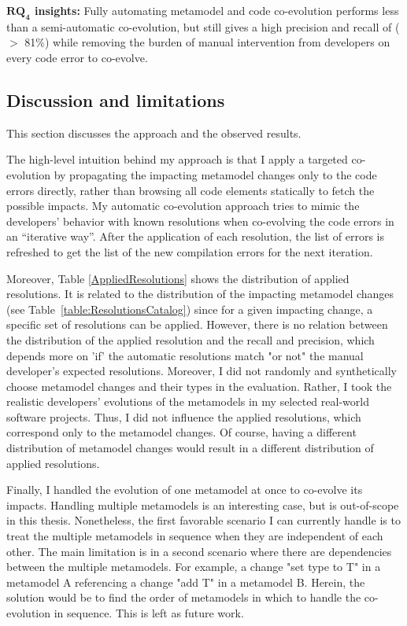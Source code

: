 \begin{tcolorbox}[boxsep=-2pt]
\textbf{$\boldsymbol{RQ_4}$ insights:}
Fully automating metamodel and code co-evolution performs less than a semi-automatic co-evolution, but still gives a high precision and recall of ($>$ 81\%) while removing the burden of manual intervention from developers on every code error to co-evolve. 
\end{tcolorbox}


\subsection{Discussion and limitations}
This section discusses the approach and the observed results. 

The high-level intuition behind my approach is that I apply a targeted co-evolution by propagating the impacting metamodel changes only to the code errors directly, rather than browsing all code elements statically to fetch the possible impacts.
My automatic co-evolution approach tries to mimic the developers' behavior with known resolutions when co-evolving the code errors in an “iterative way”. After the application of each resolution, the list of errors %
is refreshed to get the list of the new compilation errors for the next iteration.

Moreover, Table \ref{AppliedResolutions} shows the distribution of applied resolutions. It is related to the distribution of the impacting metamodel changes (see Table~\ref{table:ResolutionsCatalog}) since for a given impacting change, a specific set of resolutions can be applied. 
However, there is no relation between the distribution of the applied resolution and the recall and precision, which depends more on 'if' the automatic resolutions match "or not" the manual developer’s expected resolutions. Moreover, I did not randomly and synthetically choose metamodel changes and their types in the evaluation. Rather, I took the realistic developers' evolutions of the metamodels in my selected real-world software projects. Thus, I did not influence the applied resolutions, which correspond only to the metamodel changes. Of course, having a different distribution of metamodel changes would result in a different distribution of applied resolutions. 

Finally, I handled the evolution of one metamodel at once to co-evolve its impacts. Handling multiple metamodels is an interesting case, but is out-of-scope in this thesis. Nonetheless, the first favorable scenario I can currently handle is to treat the multiple metamodels in sequence when they are independent of each other. The main limitation is in a second scenario where there are dependencies between the multiple metamodels. For example, a change "set type to T" in a metamodel A referencing a change "add T" in a metamodel B. Herein, the solution would be to find the order of metamodels in which to handle the co-evolution in sequence. This is left as future work. 

